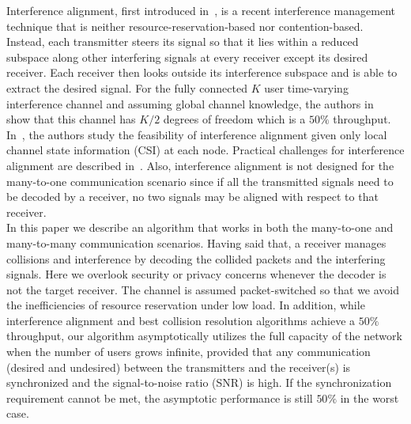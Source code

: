 \documentclass[10pt, a4paper, twocolumn]{IEEEtran}
\begin{document}
\noindent Interference alignment, first introduced in~\cite{Khandani}, is a recent interference management technique that is neither resource-reservation-based nor contention-based. Instead, each transmitter steers its signal so that it lies within a reduced subspace along other interfering signals at every receiver except its desired receiver. Each receiver then looks outside its interference subspace and is able to extract the desired signal. For the fully connected $K$ user time-varying interference channel and assuming global channel knowledge, the authors in~\cite{Jafar} show that this channel has $K/2$ degrees of freedom which is a $50\%$ throughput. In~\cite{Jafar_distributed}, the authors study the feasibility of interference alignment given only local channel state information (CSI) at each node. Practical challenges for interference alignment are described in~\cite{Heath_practical}. Also, interference alignment is not designed for the many-to-one communication scenario since if all the transmitted signals need to be decoded by a receiver, no two signals may be aligned with respect to that receiver.\\

\noindent In this paper we describe an algorithm that works in both the many-to-one and many-to-many communication scenarios. Having said that, a receiver manages collisions and interference by decoding the collided packets and the interfering signals. Here we overlook security or privacy concerns whenever the decoder is not the target receiver. The channel is assumed packet-switched so that we avoid the inefficiencies of resource reservation under low load. In addition, while interference alignment and best collision resolution algorithms achieve a $50\%$ throughput, our algorithm asymptotically utilizes the full capacity of the network when the number of users grows infinite, provided that any communication (desired and undesired) between the transmitters and the receiver(s) is synchronized and the signal-to-noise ratio (SNR) is high. If the synchronization requirement cannot be met, the asymptotic performance is still $50\%$ in the worst case.\\  
\end{document}
